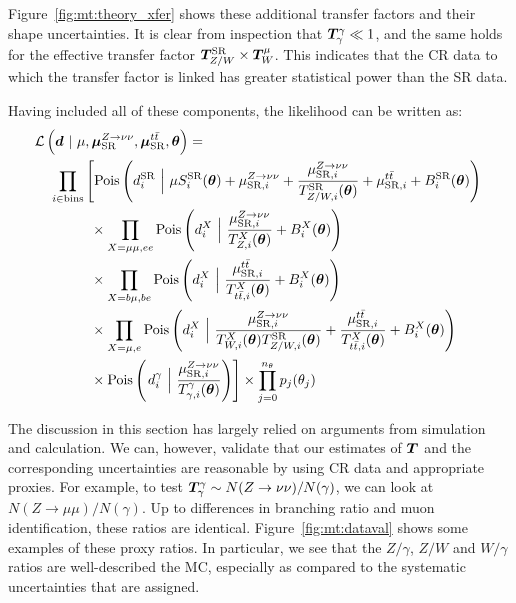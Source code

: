 Figure~\ref{fig:mt:theory_xfer} shows these additional transfer factors and their shape uncertainties.
It is clear from inspection that $\bm{T}^{\gamma}_{\gamma} \ll 1$, and the same holds for the effective transfer factor $\bm{T}^{\mathrm{SR}}_{Z/W}\times \bm{T}^{\mu}_{W}$.
This indicates that the CR data to which the transfer factor is linked has greater statistical power than the SR data.

Having included all of these components, the likelihood can be written as:
\begin{align}
    \mathcal{L}\left(\bm{d}~|~ \mu,\muz,\mut,\bm{\theta}\right) = \hspace{-30mm} & \nonumber \\
    \prod_{i\in\mathrm{bins}} & \left[
    \pois\left(d^{\mathrm{SR}}_{i} ~\Big|~ \mu S^{\mathrm{SR}}_{i}(\bm\theta)  + \muzi + \frac{\muzi}{\Ti{\mathrm{SR}}{Z/W}(\bm\theta)} + \muti + B^{\mathrm{SR}}_{i}(\bm\theta)\right) \vphantom{\frac{\muzi}{\Ti{\mu\mu}{Z}(\bm\theta)}}\right. \nonumber \\
    & \phantom{\Big[} \times \prod_{X=\mu\mu,ee} \pois\left(d^{X}_i~\Big|~ \frac{\muzi}{\Ti{X}{Z}(\bm\theta)} + B^{X}_i(\bm\theta) \right) \nonumber \\
    & \phantom{\Big[} \times \prod_{X=b\mu,be}\pois\left(d^{X}_i~\Big|~ \frac{\muti}{\Ti{X}{\ttbar}(\bm\theta)} + B^{X}_i(\bm\theta) \right) \nonumber \\
    & \phantom{\Big[} \times \prod_{X=\mu,e} \pois\left(d^{X}_i~\Big|~ \frac{\muzi}{\Ti{X}{W}(\bm\theta)\Ti{\mathrm{SR}}{Z/W}(\bm\theta)} + \frac{\muti}{\Ti{X}{\ttbar}(\bm\theta)} + B^{X}_i(\bm\theta) \right) \nonumber \\
    & \phantom{\Big[} \times \pois\left(\left.d^\gamma_i~\Big|~ \frac{\muzi}{\Ti\gamma\gamma(\bm\theta)} \right) \right]  \times  \prod_{j=0}^{n_\theta} p_j(\theta_j)
\end{align}

The discussion in this section has largely relied on arguments from simulation and calculation.
We can, however, validate that our estimates of $\bm{T}^{}_{}$ and the corresponding uncertainties are reasonable by using CR data and appropriate proxies.
For example, to test $\bm{T}^{\gamma}_{\gamma} \sim N(Z\rightarrow\nu\nu) / N(\gamma)$, we can look at $N(Z\rightarrow\mu\mu) / N(\gamma)$.
Up to differences in branching ratio and muon identification, these ratios are identical.
Figure~\ref{fig:mt:dataval} shows some examples of these proxy ratios.
In particular, we see that the $Z/\gamma$, $Z/W$ and $W/\gamma$ ratios are well-described the MC, especially as compared to the systematic uncertainties that are assigned.

